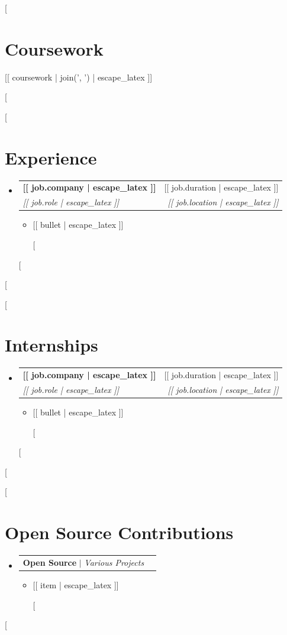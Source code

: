 \documentclass[letterpaper,11pt]{article}
\makeatletter
\newcommand{\resumeItem}[1]{
  \item\small{{#1 \vspace{-2pt}}}
}
\newcommand{\resumeSubheading}[4]{
  \vspace{-2pt}\item
  \begin{tabular*}{0.97\textwidth}[t]{l@{\extracolsep{\fill}}r}
    \textbf{#1} & #2 \\
    \textit{\small#3} & \textit{\small #4} \\
  \end{tabular*}\vspace{-7pt}
}
\newcommand{\resumeProjectHeading}[2]{
  \item
  \begin{tabular*}{0.97\textwidth}{l@{\extracolsep{\fill}}r}
    \small#1 & #2 \\
  \end{tabular*}\vspace{-7pt}
}
\newcommand{\resumeSubHeadingListStart}{\begin{itemize}[leftmargin=0.15in, label={}]}
\newcommand{\resumeSubHeadingListEnd}{\end{itemize}}
\newcommand{\resumeItemListStart}{\begin{itemize}}
\newcommand{\resumeItemListEnd}{\end{itemize}\vspace{-5pt}}
\makeatother
\begin{document}
[%
\section{Coursework}
 \begin{itemize}[leftmargin=0.15in, label={}]
    \small{\item{[[ coursework | join(', ') | escape_latex ]]}}
 \end{itemize}
 \vspace{-16pt}
[%

[%
\section{Experience}
  \resumeSubHeadingListStart
    [%
    \resumeSubheading
      {[[ job.company | escape_latex ]]}{[[ job.duration | escape_latex ]]}
      {[[ job.role | escape_latex ]]}{[[ job.location | escape_latex ]]}
      \resumeItemListStart
        [%
        \resumeItem{[[ bullet | escape_latex ]]}
        [%
      \resumeItemListEnd
    [%
  \resumeSubHeadingListEnd
[%

[%
\section{Internships}
  \resumeSubHeadingListStart
    [%
    \resumeSubheading
      {[[ job.company | escape_latex ]]}{[[ job.duration | escape_latex ]]}
      {[[ job.role | escape_latex ]]}{[[ job.location | escape_latex ]]}
      \resumeItemListStart
        [%
        \resumeItem{[[ bullet | escape_latex ]]}
        [%
      \resumeItemListEnd
    [%
  \resumeSubHeadingListEnd
[%

[%
\section{Open Source Contributions}
\resumeSubHeadingListStart
  \resumeProjectHeading
      {\textbf{Open Source} $|$ \emph{Various Projects}}{}
      \resumeItemListStart
        [%
        \resumeItem{[[ item | escape_latex ]]}
        [%
      \resumeItemListEnd
\resumeSubHeadingListEnd
[%
\end{document}
